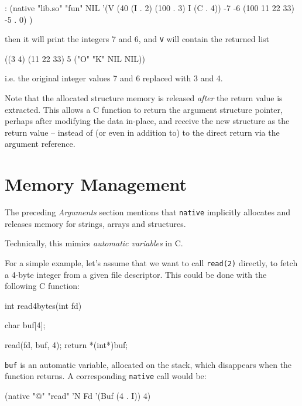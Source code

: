 \begin{wideverbatim}
: (native "lib.so" "fun" NIL
   '(V (40 (I . 2) (100 . 3) I (C . 4)) -7 -6 (100 11 22 33) -5 . 0) )
\end{wideverbatim}

then it will print the integers 7 and 6, and \texttt{V} will contain the
returned list

\begin{wideverbatim}
((3 4) (11 22 33) 5 ("O" "K" NIL NIL))
\end{wideverbatim}

i.e. the original integer values 7 and 6 replaced with 3 and 4.

Note that the allocated structure memory is released \emph{after} the
return value is extracted. This allows a C function to return the
argument structure pointer, perhaps after modifying the data in-place,
and receive the new structure as the return value -- instead of (or even
in addition to) to the direct return via the argument reference.


\section{Memory Management}
\label{sec:native-memory-management}

The preceding \emph{Arguments} section mentions that
\texttt{native} implicitly allocates and releases memory for strings,
arrays and structures.

Technically, this mimics \emph{automatic variables} in C.

For a simple example, let's assume that we want to call \texttt{read(2)}
directly, to fetch a 4-byte integer from a given file descriptor. This
could be done with the following C function:

\begin{wideverbatim}
int read4bytes(int fd) {
   char buf[4];

   read(fd, buf, 4);
   return *(int*)buf;
}
\end{wideverbatim}

\texttt{buf} is an automatic variable, allocated on the stack, which
disappears when the function returns. A corresponding \texttt{native}
call would be:

\begin{wideverbatim}
(native "@" "read" 'N Fd '(Buf (4 . I)) 4)
\end{wideverbatim}

